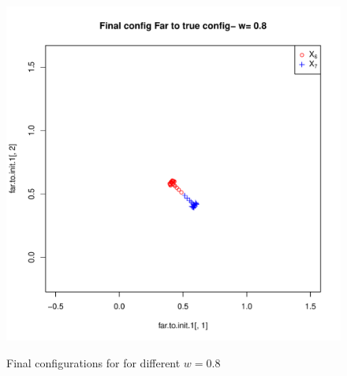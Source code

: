 \documentclass[12pt,oneside,final]{thesis}
\begin{document}
\begin{figure}
\begin{minipage}[b]{0.5\linewidth}
\end{minipage}
\hspace{0.5cm}
\begin{minipage}[b]{0.5\linewidth}
\centering
\includegraphics[scale=0.45]{other-min-w0_8.pdf}
\label{fig:Finalconfig-MultMin-w-0_8_a}


\end{minipage}

\caption{Final configurations for for different $w=0.8$ }
\label{fig:Finalconfig-MultMin-w-0_8}

\end{figure}
\end{document}
